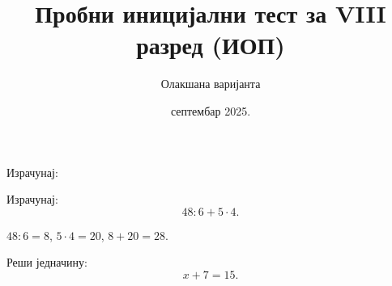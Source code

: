 \documentclass[11pt,a5paper,twoside,addpoints,answers]{exam}   %
\title{Пробни иницијални тест за VIII разред (ИОП)}
\author{Олакшана варијанта}
\date{септембар 2025.}
\begin{document}
\maketitle
\thispagestyle{headandfoot}

\ifprintanswers\else
\begin{flushleft}
\gradetable[v]\newpage
\end{flushleft}
\fi

\begin{questions}

\question[6]
Израчунај:
\begin{multicols}{3}
\end{multicols}

\begin{solution}[\stretch 1]
\end{solution}

\question[6]
Израчунај:
\[
48 : 6 + 5 \cdot 4.
\]

\begin{solution}[\stretch 1]
$48:6=8$, $5\cdot4=20$, $8+20=28$.
\end{solution}

\ifprintanswers\else\newpage\fi

\question[6]
Реши једначину:
\[
x+7=15.
\]


\end{questions}
\end{document}
